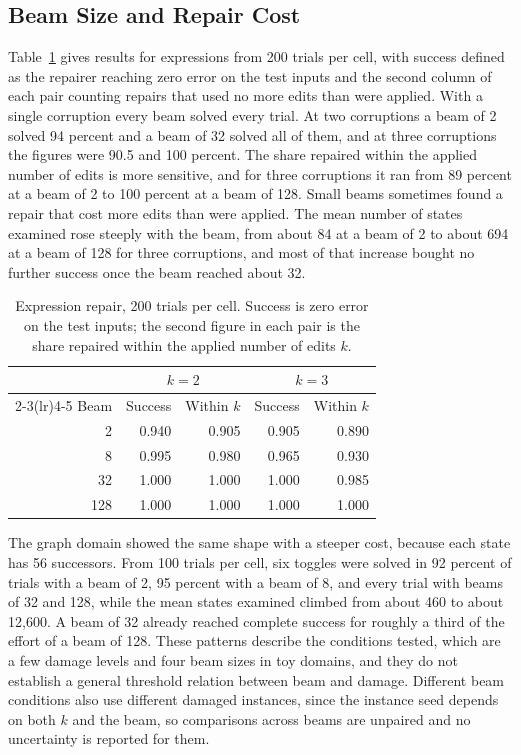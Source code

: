 \documentclass[11pt]{article}
\begin{document}
\subsection{Beam Size and Repair Cost}

Table~\ref{tab:expr} gives results for expressions from 200 trials per cell, with success defined as the repairer reaching zero error on the test inputs and the second column of each pair counting repairs that used no more edits than were applied. With a single corruption every beam solved every trial. At two corruptions a beam of 2 solved 94 percent and a beam of 32 solved all of them, and at three corruptions the figures were 90.5 and 100 percent. The share repaired within the applied number of edits is more sensitive, and for three corruptions it ran from 89 percent at a beam of 2 to 100 percent at a beam of 128. Small beams sometimes found a repair that cost more edits than were applied. The mean number of states examined rose steeply with the beam, from about 84 at a beam of 2 to about 694 at a beam of 128 for three corruptions, and most of that increase bought no further success once the beam reached about 32.

\begin{table}[ht]
\centering
\caption{Expression repair, 200 trials per cell. Success is zero error on the test inputs; the second figure in each pair is the share repaired within the applied number of edits $k$.}
\label{tab:expr}
\begin{tabular}{rrrrr}
\toprule
 & \multicolumn{2}{c}{$k=2$} & \multicolumn{2}{c}{$k=3$}\\
\cmidrule(lr){2-3}\cmidrule(lr){4-5}
Beam & Success & Within $k$ & Success & Within $k$\\
\midrule
2 & 0.940 & 0.905 & 0.905 & 0.890\\
8 & 0.995 & 0.980 & 0.965 & 0.930\\
32 & 1.000 & 1.000 & 1.000 & 0.985\\
128 & 1.000 & 1.000 & 1.000 & 1.000\\
\bottomrule
\end{tabular}
\end{table}

The graph domain showed the same shape with a steeper cost, because each state has 56 successors. From 100 trials per cell, six toggles were solved in 92 percent of trials with a beam of 2, 95 percent with a beam of 8, and every trial with beams of 32 and 128, while the mean states examined climbed from about 460 to about 12{,}600. A beam of 32 already reached complete success for roughly a third of the effort of a beam of 128. These patterns describe the conditions tested, which are a few damage levels and four beam sizes in toy domains, and they do not establish a general threshold relation between beam and damage. Different beam conditions also use different damaged instances, since the instance seed depends on both $k$ and the beam, so comparisons across beams are unpaired and no uncertainty is reported for them.
\end{document}
